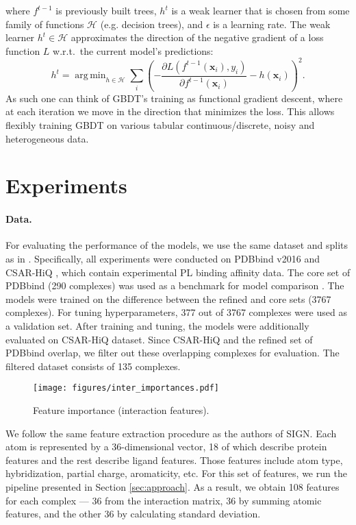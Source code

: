\documentclass[nohyperref]{article}
\newcommand{\x}{\mathbf{x}}
\DeclareMathOperator*{\argmin}{arg\,min}
\theoremstyle{plain}
\theoremstyle{definition}
\theoremstyle{remark}
\begin{document}
where $f^{t-1}$ is previously built trees, $h^{t}$ is a weak learner that is chosen from some family of functions $\mathcal{H}$ (e.g. decision trees), and $\epsilon$ is a learning rate. The weak learner $h^{t}\in \mathcal{H}$ approximates the direction of the negative gradient of a loss function $L$ w.r.t.~the current model's predictions:
\begin{equation}
\label{eq:tree}
h^{t} = \argmin_{h\in \mathcal{H}} \sum_i \left(-\frac{\partial L(f^{t-1}(\x_i), y_i)}{\partial f^{t-1}(\x_i)}- h(\x_i)\right)^2 . 
\end{equation}
As such one can think of GBDT's training as functional gradient descent, where at each iteration we move in the direction that minimizes the loss. This allows flexibly training GBDT on various tabular continuous/discrete, noisy and heterogeneous data.

\section{Experiments}
\label{sec:experiments}
\paragraph{Data.}
For evaluating the performance of the models, we use the same dataset and splits as in \cite{sign}. Specifically, all experiments were conducted on PDBbind v2016 \cite{pdbbind} and CSAR-HiQ \cite{csar}, which contain experimental PL binding affinity data. The core set of PDBbind (290 complexes) was used as a benchmark for model comparison \cite{core}. The models were trained on the difference between the refined and core sets (3767 complexes). For tuning hyperparameters, 377 out of 3767 complexes were used as a validation set. After training and tuning, the models were additionally evaluated on CSAR-HiQ dataset. Since CSAR-HiQ and the refined set of PDBbind overlap, we filter out these overlapping complexes for evaluation. The filtered dataset consists of 135 complexes.

\begin{figure}[t]
\vskip 0.2in
\begin{center}
\centerline{\texttt{[image: figures/inter\_importances.pdf]}}
\caption{Feature importance (interaction features).}
\label{fig:inter_importances}
\end{center}
\vskip -0.2in
\end{figure}

We follow the same feature extraction procedure as the authors of SIGN. Each atom is represented by a 36-dimensional vector, 18 of which describe protein features and the rest describe ligand features. Those features include atom type, hybridization, partial charge, aromaticity, etc. For this set of features, we run the pipeline presented in Section \ref{sec:approach}. As a result, we obtain 108 features for each complex — 36 from the interaction matrix, 36 by summing atomic features, and the other 36 by calculating standard deviation.
\end{document}
